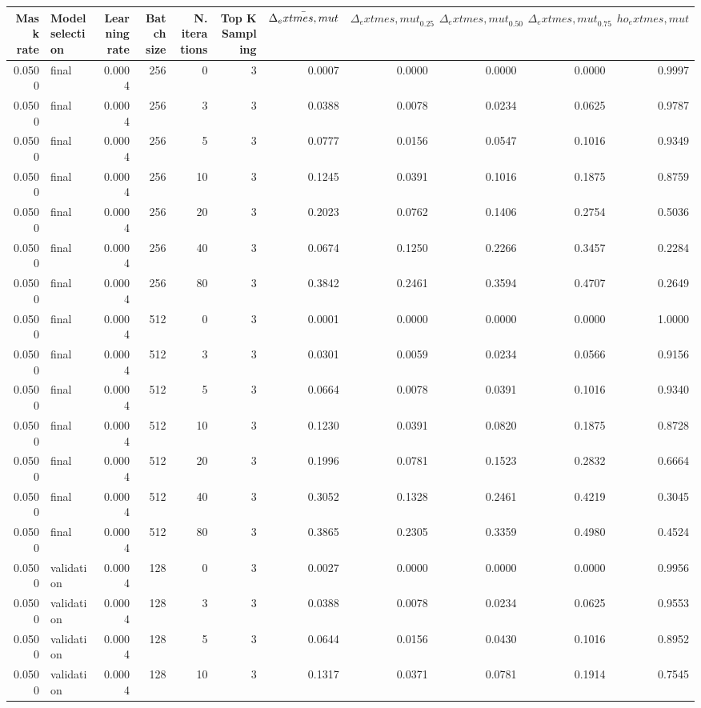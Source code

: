 \begin{tabular}{rlrrrrrrrrr}
\toprule
Mask rate & Model selection & Learning rate & Batch size & N. iterations & Top K Sampling & $\Bar{\Delta_	ext{mes,mut}}$ & $\Delta_	ext{mes,mut}_0.25$ & $\Delta_	ext{mes,mut}_0.50$ & $\Delta_	ext{mes,mut}_0.75$ & $
ho_	ext{mes,mut}$ \\
\midrule
0.0500 & final & 0.0004 & 256 & 0 & 3 & 0.0007 & 0.0000 & 0.0000 & 0.0000 & 0.9997 \\
0.0500 & final & 0.0004 & 256 & 3 & 3 & 0.0388 & 0.0078 & 0.0234 & 0.0625 & 0.9787 \\
0.0500 & final & 0.0004 & 256 & 5 & 3 & 0.0777 & 0.0156 & 0.0547 & 0.1016 & 0.9349 \\
0.0500 & final & 0.0004 & 256 & 10 & 3 & 0.1245 & 0.0391 & 0.1016 & 0.1875 & 0.8759 \\
0.0500 & final & 0.0004 & 256 & 20 & 3 & 0.2023 & 0.0762 & 0.1406 & 0.2754 & 0.5036 \\
0.0500 & final & 0.0004 & 256 & 40 & 3 & 0.0674 & 0.1250 & 0.2266 & 0.3457 & 0.2284 \\
0.0500 & final & 0.0004 & 256 & 80 & 3 & 0.3842 & 0.2461 & 0.3594 & 0.4707 & 0.2649 \\
0.0500 & final & 0.0004 & 512 & 0 & 3 & 0.0001 & 0.0000 & 0.0000 & 0.0000 & 1.0000 \\
0.0500 & final & 0.0004 & 512 & 3 & 3 & 0.0301 & 0.0059 & 0.0234 & 0.0566 & 0.9156 \\
0.0500 & final & 0.0004 & 512 & 5 & 3 & 0.0664 & 0.0078 & 0.0391 & 0.1016 & 0.9340 \\
0.0500 & final & 0.0004 & 512 & 10 & 3 & 0.1230 & 0.0391 & 0.0820 & 0.1875 & 0.8728 \\
0.0500 & final & 0.0004 & 512 & 20 & 3 & 0.1996 & 0.0781 & 0.1523 & 0.2832 & 0.6664 \\
0.0500 & final & 0.0004 & 512 & 40 & 3 & 0.3052 & 0.1328 & 0.2461 & 0.4219 & 0.3045 \\
0.0500 & final & 0.0004 & 512 & 80 & 3 & 0.3865 & 0.2305 & 0.3359 & 0.4980 & 0.4524 \\
0.0500 & validation & 0.0004 & 128 & 0 & 3 & 0.0027 & 0.0000 & 0.0000 & 0.0000 & 0.9956 \\
0.0500 & validation & 0.0004 & 128 & 3 & 3 & 0.0388 & 0.0078 & 0.0234 & 0.0625 & 0.9553 \\
0.0500 & validation & 0.0004 & 128 & 5 & 3 & 0.0644 & 0.0156 & 0.0430 & 0.1016 & 0.8952 \\
0.0500 & validation & 0.0004 & 128 & 10 & 3 & 0.1317 & 0.0371 & 0.0781 & 0.1914 & 0.7545 \\

\end{tabular}
